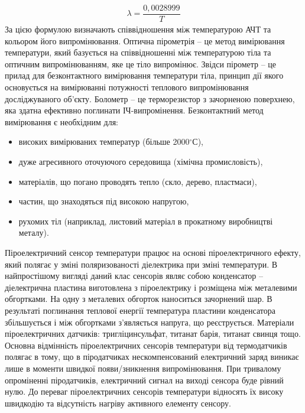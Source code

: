 \documentclass[a4paper,14pt]{extreport}
\begin{document}
  \begin{align}
  \lambda = \dfrac{0,0028999}{T}
  \end{align}
  За цією формулою визначають співвідношення між температурою АЧТ та
  кольором його випромінювання. Оптична пірометрія – це метод вимірювання
  температури, який базується на співвідношенні між температурою тіла та
  оптичним випромінюванням, яке це тіло випромінює. Звідси пірометр – це прилад для безконтактного вимірювання температури тіла, принцип дії якого основується
  на вимірюванні потужності теплового випромінювання досліджуваного об’єкту.
  Болометр – це терморезистор з зачорненою поверхнею, яка здатна ефективно
  поглинати ІЧ-випромінення. Безконтактний метод вимірювання є необхідним для:
  \begin{itemize}
  \item високих вимірюваних температур (більше 2000$^\circ$С),
  \item дуже агресивного оточуючого середовища (хімічна промисловість),
  \item матеріалів, що погано проводять тепло (скло, дерево, пластмаси),
  \item частин, що знаходяться під високою напругою,
  \item рухомих тіл (наприклад, листовий матеріал в прокатному виробництві
  металу).
  \end{itemize}

  Піроелектричний сенсор температури працює на основі піроелектричного
  ефекту, який полягає у зміні поляризованості діелектрика при зміні температури.
  В найпростішому вигляді даний клас сенсорів являє собою конденсатор –
  діелектрична пластина виготовлена з піроелектрику і розміщена між металевими
  обгортками. На одну з металевих обгорток наноситься зачорнений шар. В
  результаті поглинання теплової енергії температура пластини конденсатора
  збільшується і між обгортками з’являється напруга, що реєструється.
  Матеріали піроелектричних датчиків: тригліцинсульфат, титанат барія,
  титанат свинця тощо. Основна відмінність піроелектричних сенсорів температури
  від термодатчиків полягає в тому, що в піродатчиках нескомпенсований
  електричний заряд виникає лише в моменти швидкої появи/зникнення
  випромінювання. При тривалому опроміненні піродатчиків, електричний сигнал
  на виході сенсора буде рівний нулю. До переваг піроелектричних сенсорів
  температури відносять їх високу швидкодію та відсутність нагріву активного
  елементу сенсору.
\end{document}
